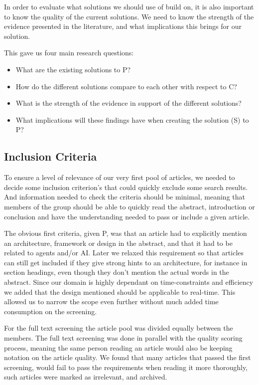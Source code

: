 In order to evaluate what solutions we should use of build on, it is also important to know the quality of the current solutions. We need to know the strength of the evidence presented in the literature, and what implications this brings for our solution.

This gave us four main research questions:
\begin{itemize}
\item What are the existing solutions to P?
\item How do the different solutions compare to each other with respect to C?
\item What is the strength of the evidence in support of the different solutions?
\item What implications will these findings have when creating the solution (S) to P?
\end{itemize}

\subsection{Inclusion Criteria}
\label{sub:inclusion_criteria}
To ensure a level of relevance of our very first pool of articles, we needed to decide some inclusion criterion's that could quickly exclude some search results. And information needed to check the criteria should be minimal, meaning that members of the group should be able to quickly read the abstract, introduction or conclusion and have the understanding needed to pass or include a given article.

The obvious first criteria, given P, was that an article had to explicitly mention an architecture, framework or design in the abstract, and that it had to be related to agents and/or AI. Later we relaxed this requirement so that articles can still get included if they give strong hints to an architecture, for instance in section headings, even though they don’t mention the actual words in the abstract.
Since our domain is highly dependant on time-constraints and efficiency we added that the design mentioned should be applicable to real-time. This allowed us to narrow the scope even further without much added time consumption on the screening.

For the full text screening the article pool was divided equally between the members. The full text screening was done in parallel with the quality scoring process, meaning the same person reading an article would also be keeping notation on the article quality. 
We found that many articles that passed the first screening, would fail to pass the requirements when reading it more thoroughly, such articles were marked as irrelevant, and archived.

